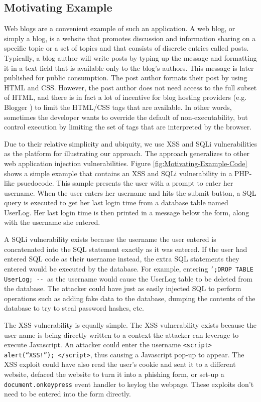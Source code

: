 \subsection{Motivating Example}


Web blogs are a convenient
example of such an application. A web blog, or simply a blog, is a
website that promotes discussion and information sharing on a specific
topic or a set of topics and that consists of discrete entries called posts.
Typically, a blog author will write posts by typing up the message
and formatting it in a text field that is available only to the blog's
authors. This message is later published for public consumption. The
post author formats their post by using HTML and CSS. However, the
post author does not need access to the full subset of HTML, and there
is in fact a lot of incentive for blog hosting providers (e.g. Blogger
\cite{blogger}) to limit the HTML/CSS tags that are available. In other words, sometimes the developer wants to override the default of non-executability, but control execution by limiting the set of tags that are interpreted by the browser.

Due to their relative simplicity and ubiquity, we use XSS and SQLi
vulnerabilities as the platform for illustrating our approach. The
approach generalizes to other web application injection vulnerabilities.
Figure \ref{fig:Motivating-Example-Code} shows a simple example that
contains an XSS and SQLi vulnerability in a PHP-like psuedocode. This
sample presents the user with a prompt to enter her username. When
the user enters her username and hits the submit button, a SQL query
is executed to get her last login time from a database table named
UserLog. Her last login time is then printed in a message below
the form, along with the username she entered. 

A SQLi vulnerability exists because the username the user entered
is concatenated into the SQL statement exactly as it was entered.
If the user had entered SQL code as their username instead, the extra
SQL statements they entered would be executed by the database. For
example, entering \texttt{';DROP TABLE UserLog; -{}- }as the username
would cause the UserLog table to be deleted from the database. The
attacker could have just as easily injected SQL to perform operations
such as adding fake data to the database, dumping the contents of
the database to try to steal password hashes, etc. 

The XSS vulnerability is equally simple.
The XSS vulnerability exists because the user name is being directly
written to a context the attacker can leverage to execute Javascript.
An attacker could enter the username \texttt{<script> alert(``XSS!''); </script>},
thus causing a Javascript pop-up to appear. The XSS exploit could
have also read the user's cookie and sent it to a different website,
defaced the website to turn it into a phishing form, or set-up a \texttt{document.onkeypress}
event handler to keylog the webpage. These exploits don't need to
be entered into the form directly.

